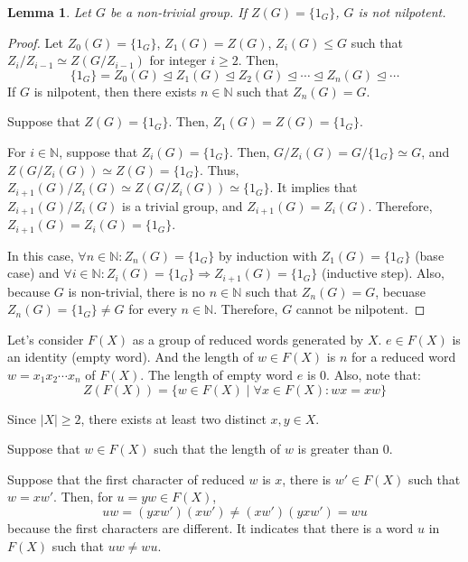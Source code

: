 \documentclass{article}
\newtheorem{lemma}{Lemma}
\newcommand{\bbN}{\mathbb{N}}
\begin{document}
\begin{lemma}\label{lem-nil-z-1}
  Let \(G\) be a non-trivial group. If \(Z(G) = \{1_G\}\), \(G\) is not nilpotent.
\end{lemma}
\begin{proof}
  Let \(Z_0(G) = \{1_G\}\), \(Z_1(G) = Z(G)\), \(Z_{i}(G) \le G\) such that \(Z_i / Z_{i - 1} \simeq Z(G / Z_{i - 1})\) for integer \(i \ge 2\).
  Then,
  \[\{1_G\} = Z_0(G) \trianglelefteq Z_1(G) \trianglelefteq Z_2(G) \trianglelefteq \cdots \trianglelefteq Z_n(G) \trianglelefteq \cdots\]
  If \(G\) is nilpotent, then there exists \(n \in \bbN\) such that \(Z_n(G) = G\).

  Suppose that \(Z(G) = \{1_G\}\).
  Then, \(Z_1(G) = Z(G) = \{1_G\}\).

  For \(i \in \bbN\), suppose that \(Z_i(G) = \{1_G\}\).
  Then, \(G / Z_i(G) = G / \{1_G\} \simeq G\),
  and \(Z(G / Z_i(G)) \simeq Z(G) = \{1_G\}\).
  Thus, \(Z_{i + 1}(G) / Z_i(G) \simeq Z(G / Z_i(G)) \simeq \{1_G\}\).
  It implies that \(Z_{i + 1}(G) / Z_i(G)\) is a trivial group, and \(Z_{i + 1}(G) = Z_i(G)\).
  Therefore, \(Z_{i + 1}(G) = Z_i(G) = \{1_G\}\).

  In this case, \(\forall n \in \bbN: Z_n(G) = \{1_G\}\) by induction with \(Z_1(G) = \{1_G\}\) (base case) and \(\forall i \in \bbN: Z_i(G) = \{1_G\} \Rightarrow Z_{i + 1}(G) = \{1_G\}\) (inductive step).
  Also, because \(G\) is non-trivial, there is no \(n \in \bbN\) such that \(Z_n(G) = G\), becuase \(Z_n(G) = \{1_G\} \neq G\) for every \(n \in \bbN\).
  Therefore, \(G\) cannot be nilpotent.
\end{proof}

Let's consider \(F(X)\) as a group of reduced words generated by \(X\). \(e \in F(X)\) is an identity (empty word). And the length of \(w \in F(X)\) is \(n\) for a reduced word \(w = x_1 x_2 \cdots x_n\) of \(F(X)\). The length of empty word \(e\) is 0. Also, note that:
\[Z(F(X)) = \{w \in F(X) \mid \forall x \in F(X): wx = xw\}\]

Since \(|X| \ge 2\), there exists at least two distinct \(x, y \in X\).

Suppose that \(w \in F(X)\) such that the length of \(w\) is greater than 0.

Suppose that the first character of reduced \(w\) is \(x\), there is \(w' \in F(X)\) such that \(w = xw'\). Then, for \(u = yw \in F(X)\),
\[ uw = (yxw')(xw') \neq (xw')(yxw') = wu \]
because the first characters are different.
It indicates that there is a word \(u\) in \(F(X)\) such that \(uw \neq wu\).
\end{document}
